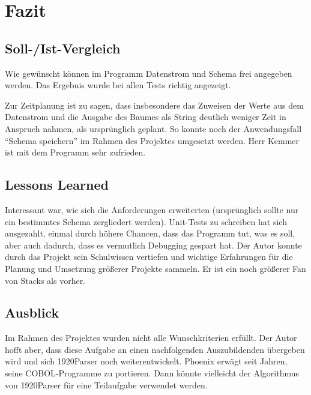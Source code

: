 \section{Fazit} 
\label{sec:Fazit}

\subsection{Soll-/Ist-Vergleich}
\label{sec:SollIstVergleich}
Wie gewünscht können im Programm Datenstrom und Schema frei angegeben werden. Das Ergebnis wurde bei allen Tests richtig angezeigt.

Zur Zeitplanung ist zu sagen, dass insbesondere das Zuweisen der Werte aus dem Datenstrom und die Ausgabe des Baumes als String deutlich weniger Zeit in Anspruch nahmen, als ursprünglich geplant. So konnte noch der Anwendungsfall ``Schema speichern'' im Rahmen des Projektes umgesetzt werden.
Herr Kemmer ist mit dem Programm sehr zufrieden.
\subsection{Lessons Learned}
\label{sec:LessonsLearned}
Interessant war, wie sich die Anforderungen erweiterten (ursprünglich sollte nur ein bestimmtes Schema zergliedert werden). Unit-Tests zu schreiben hat sich ausgezahlt, einmal durch höhere Chancen, dass das Programm tut, was es soll, aber auch dadurch, dass es vermutlich Debugging gespart hat. Der Autor konnte durch das Projekt sein Schulwissen vertiefen und wichtige Erfahrungen für die Planung und Umsetzung größerer Projekte sammeln. Er ist ein noch größerer Fan von Stacks als vorher.
\subsection{Ausblick}
\label{sec:Ausblick}
Im Rahmen des Projektes wurden nicht alle Wunschkriterien erfüllt. Der Autor hofft aber, dass diese Aufgabe an einen nachfolgenden Auszubildenden übergeben wird und sich 1920Parser noch weiterentwickelt. Phoenix erwägt seit Jahren, seine COBOL-Programme zu portieren. Dann könnte vielleicht der Algorithmus von 1920Parser für eine Teilaufgabe verwendet werden.





